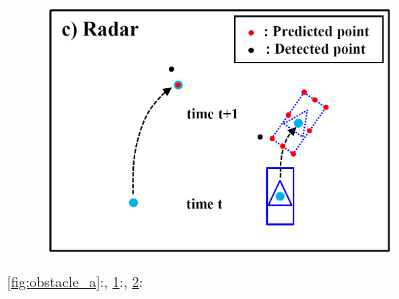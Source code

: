 \begin{figure}
\begin{subfigure}[b]{0.3\textwidth}
        \caption{}
        \label{fig:obstacle_b}
    \end{subfigure}
    \begin{subfigure}[b]{0.3\textwidth}
        \includegraphics[width=\textwidth]{src/pic/obstacle_c.png}
        \caption{}
        \label{fig:obstacle_c}
    \end{subfigure}
    \caption{\ref{fig:obstacle_a}:, \ref{fig:obstacle_b}:, \ref{fig:obstacle_c}:}
    \label{fig:obstacle}
\end{figure}
